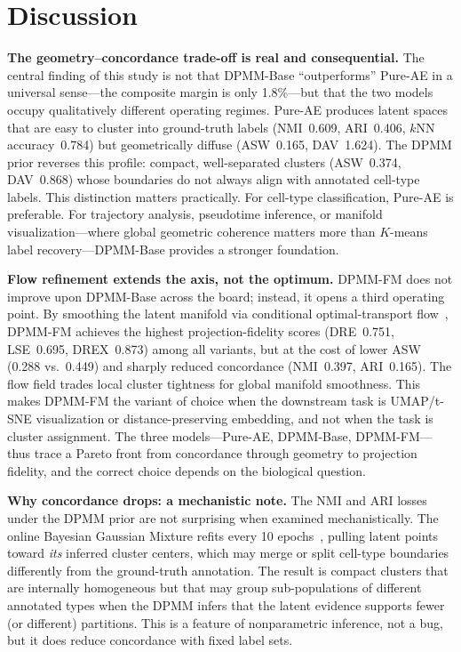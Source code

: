 \documentclass[biology,article,submit,pdftex,moreauthors]{Definitions/mdpi}
\begin{document}
\FloatBarrier
\section{Discussion}\label{sec:discussion}

\textbf{The geometry--concordance trade-off is real and consequential.}
The central finding of this study is not that DPMM-Base ``outperforms'' Pure-AE in a universal sense---the composite margin is only 1.8\%---but that the two models occupy qualitatively different operating regimes. Pure-AE produces latent spaces that are easy to cluster into ground-truth labels (NMI~0.609, ARI~0.406, $k$NN accuracy~0.784) but geometrically diffuse (ASW~0.165, DAV~1.624). The DPMM prior reverses this profile: compact, well-separated clusters (ASW~0.374, DAV~0.868) whose boundaries do not always align with annotated cell-type labels. This distinction matters practically. For cell-type classification, Pure-AE is preferable. For trajectory analysis, pseudotime inference, or manifold visualization---where global geometric coherence matters more than $K$-means label recovery---DPMM-Base provides a stronger foundation.

\textbf{Flow refinement extends the axis, not the optimum.}
DPMM-FM does not improve upon DPMM-Base across the board; instead, it opens a third operating point. By smoothing the latent manifold via conditional optimal-transport flow~\cite{lipman2023flow,tong2024improving}, DPMM-FM achieves the highest projection-fidelity scores (DRE~0.751, LSE~0.695, DREX~0.873) among all variants, but at the cost of lower ASW (0.288 vs.\ 0.449) and sharply reduced concordance (NMI~0.397, ARI~0.165). The flow field trades local cluster tightness for global manifold smoothness. This makes DPMM-FM the variant of choice when the downstream task is UMAP/t-SNE visualization or distance-preserving embedding, and not when the task is cluster assignment. The three models---Pure-AE, DPMM-Base, DPMM-FM---thus trace a Pareto front from concordance through geometry to projection fidelity, and the correct choice depends on the biological question.

\textbf{Why concordance drops: a mechanistic note.}
The NMI and ARI losses under the DPMM prior are not surprising when examined mechanistically. The online Bayesian Gaussian Mixture refits every 10 epochs~\cite{blei2006variational}, pulling latent points toward \emph{its} inferred cluster centers, which may merge or split cell-type boundaries differently from the ground-truth annotation. The result is compact clusters that are internally homogeneous but that may group sub-populations of different annotated types when the DPMM infers that the latent evidence supports fewer (or different) partitions. This is a feature of nonparametric inference, not a bug, but it does reduce concordance with fixed label sets.
\end{document}
